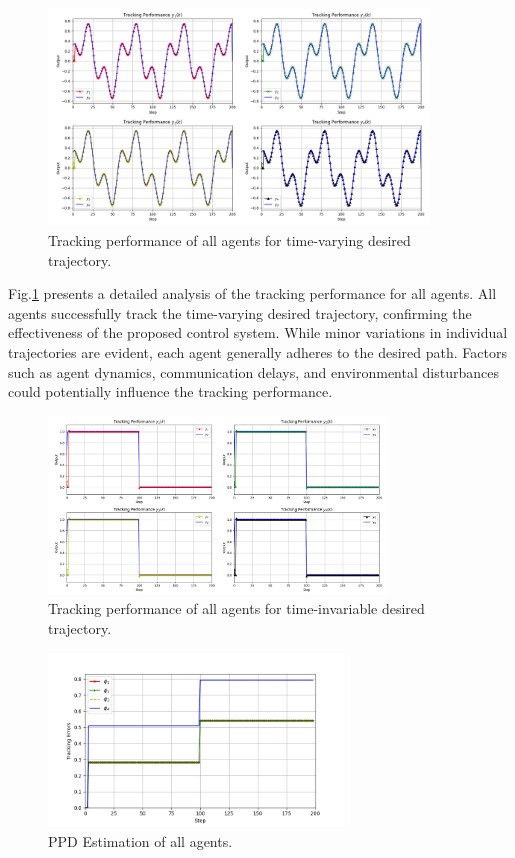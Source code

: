 \documentclass[journal,onecolumn]{IEEEtran}
\begin{document}
\begin{figure}[H]
    \centering
    \includegraphics[width=0.9\textwidth]{Figure_1.png}
    \caption{Tracking performance of all agents for time-varying desired trajectory.}
    \label{fig:figure_3} %
\end{figure}

Fig.\ref{fig:figure_3} presents a detailed analysis of the tracking performance for all agents. All agents successfully track the time-varying desired trajectory, confirming the effectiveness of the proposed control system. While minor variations in individual trajectories are evident, each agent generally adheres to the desired path. Factors such as agent dynamics, communication delays, and environmental disturbances could potentially influence the tracking performance.

\begin{figure}[H]
    \centering
    \includegraphics[width=0.8\textwidth]{Figure_4.png}
    \caption{Tracking performance of all agents for time-invariable desired trajectory.}
    \label{fig:figure_4} %
\end{figure}

\begin{figure}[H]
    \centering
    \includegraphics[width=0.7\textwidth]{Figure_5.png}
    \caption{PPD Estimation of all agents.}
    \label{fig:figure_5} %
\end{figure}
\end{document}
